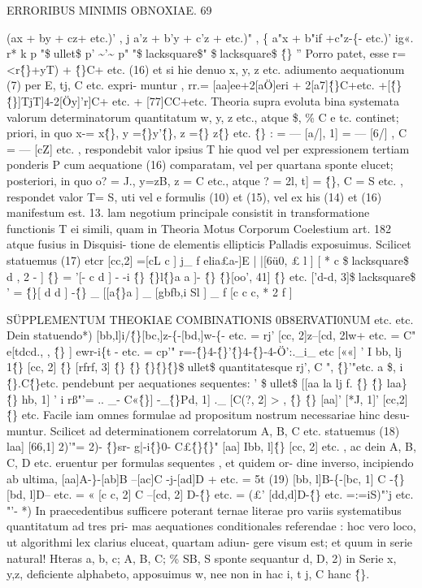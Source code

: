 \documentclass[12pt,a4paper]{article}
\begin{document}
\newpage
\begin{center}
\textsc{ERRORIBUS MINIMIS OBNOXIAE. 69}
\end{center}
(ax + by + cz+ etc.)' , j a'z + b'y + c'z + etc.)" , \{ a"x + b"if +c"z-\{- etc.)' ig«. r* k
p "\$ullet\$ p' \~{}'\~{} p" "\$lacksquare\$" \$lacksquare\$ \^\{\} ''
Porro patet, esse
r=<r\^\{\}+yT) + \^\{\}C+ etc. (16)
et si hie denuo x, y, z etc. adiumento aequationum (7) per E, tj, C etc. expri-
muntur ,
rr.= [aa]ee+2[aÖ]eri + 2[a7]\^\{\}C+etc. +[\^\{\}\^\{\}]TjT]4-2[Öy]'r]C+ etc.
+ [77]CC+etc.
Theoria supra evoluta bina systemata valorum determinatorum quantitatum
w, y, z etc., atque \$, \% C e tc. continet; priori, in quo x-= x\^\{\}, y =\^\{\}y'\^\{\}, z =\^\{\} z\^\{\} etc.
\^\{\} : = --- [a/], 1] = --- [6/] , C = --- [cZ] etc. , respondebit valor ipsius T hie
quod vel per expressionem tertiam ponderis P cum aequatione (16) comparatam,
vel per quartana sponte elucet; posteriori, in quo o? = J., y=zB, z = C etc.,
atque ? = 2l, t] = \^\{\}, C = S etc. , respondet valor T= S, uti vel e formulis
(10) et (15), vel ex his (14) et (16) manifestum est.
13.
lam negotium principale consistit in transformatione functionis T ei simili,
quam in Theoria Motus Corporum Coelestium art. 182 atque fusius in Disquisi-
tione de elementis ellipticis Palladis exposuimus. Scilicet statuemus (17)
etcr
[cc,2] =[cL c ] j\_ f elia£a-]E | |[6ü0, £ l ]
[ * c \$lacksquare\$ d , 2 - ] \^\{\} = '[- c d ] - -i \^\{\} \^\{\}l\^\{\}a a ]- \^\{\} \^\{\}[oo', 41] \^\{\}
etc.
['d-d, 3]\$lacksquare\$ ' = \^\{\}[ d d ] -\^\{\} \_ [[a\^\{\}a ] \_ [gbfb,i Sl ] \_ f [c c c, * 2 f ]

 SÜPPLEMENTUM THEOKIAE COMBINATIONIS 0B8ERVATI0NUM
etc. etc. Dein statuendo*)
[bb,l]i/\^\{\}[bc,]z-\{-[bd,]w-\{- etc. = rj'
[cc, 2]z--[cd, 2lw+ etc. = C"
e[tdcd., , \^\{\} ] ewr-i\{t - etc. = cp'"
r=-\^\{\}4-\^\{\}'\^\{\}4-\^\{\}-4-Ö':.\_i\_ etc
[««] ' I bb, lj 1\^\{\} [cc, 2] \^\{\} [rfrf, 3] \^\{\} \^\{\} \^\{\}\^\{\}\^\{\}\$ullet\$
quantitatesque rj', C ", \^\{\}'"etc. a \$, i \^\{\}.C\^\{\}etc. pendebunt per aequationes sequentes:
' \$ullet\$ [[aa la lj f.
\^\{\} \^\{\} laa\} \^\{\} hb, 1] ' i
rß"'= .. \_- C«\^\{\}] -\_\^\{\}Pd, 1] .\_ [C(?, 2] > ,
\^\{\} \^\{\} [aa]' [*J, 1]' [cc,2]\^\{\}
etc.
Facile iam omnes formulae ad propositum nostrum necessariae hinc desu-
muntur. Scilicet ad determinationem correlatorum A, B, C etc. statuemus (18)
laa] [66,1]
2)'"= 2)- \^\{\}sr- g|-i\^\{\}0- C£\^\{\}\^\{\}"
[aa] Ibb, l]\^\{\} [cc, 2]
etc. , ac dein A, B, C, D etc. eruentur per formulas sequentes , et quidem or-
dine inverso, incipiendo ab ultima,
[aa]A-\}-[ab]B --[ac]C -j-[ad]D + etc. = 5t
(19)
[bb, l]B-\{-[bc, 1] C -\^\{\}[bd, l]D-- etc. = «
[c c, 2] C --[cd, 2] D-\^\{\} etc. = (£'
[dd,d]D-\^\{\} etc. =:=iS)"'j
etc. "'-
*) In praecedentibus sufficere poterant ternae literae pro variis systematibus quantitatum ad tres pri-
mas aequationes conditionales referendae : hoc vero loco, ut algorithmi lex clarius eluceat, quartam adiun-
gere visum est; et quum in serie natural! Hteras a, b, c; A, B, C; \% SB, S sponte sequantur d, D, 2) in
Serie x, y,z, deficiente alphabeto, apposuimus w, nee non in hac i, t j, C hanc \^\{\}.
\end{document}
